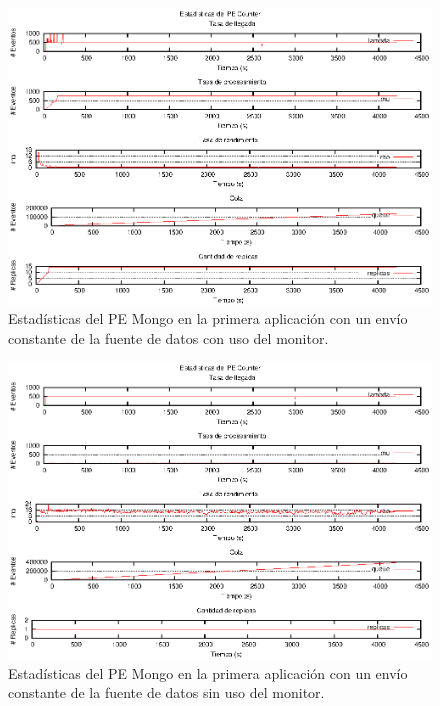 \begin{figure}[p]
\centering
    \includegraphics[scale=1.1]{images/exp/app2/uniform/cm/statusCounterPE.eps}
    \caption{Estadísticas del PE Mongo en la primera aplicación con un envío constante de la fuente de datos con uso del monitor.}
    \label{fig:app2-uniform-statusCounterPE-cm}
\end{figure}

\begin{figure}[p]
\centering
    \includegraphics[scale=1.1]{images/exp/app2/uniform/sm/statusCounterPE.eps}
    \caption{Estadísticas del PE Mongo en la primera aplicación con un envío constante de la fuente de datos sin uso del monitor.}
    \label{fig:app2-uniform-statusCounterPE-sm}
\end{figure}

